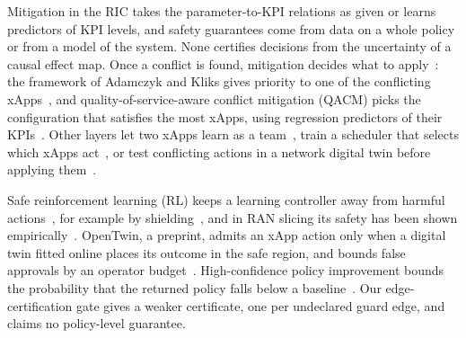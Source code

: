 Mitigation in the RIC takes the parameter-to-KPI relations as given or learns predictors of KPI levels, and safety
guarantees come from data on a whole policy or from a model of the system. None certifies decisions from the
uncertainty of a causal effect map. Once a conflict is found, mitigation decides what to
apply~\cite{ORANConflictMit,polese2023oran}: the framework of Adamczyk and Kliks gives priority to one of the
conflicting xApps~\cite{adamczyk2023conflict}, and quality-of-service-aware conflict mitigation (QACM) picks the
configuration that satisfies the most xApps, using regression predictors of their KPIs~\cite{QACM2024}. Other layers
let two xApps learn as a team~\cite{iturria2022matl}, train a scheduler that selects which xApps
act~\cite{cinemre2026scheduler}, or test conflicting actions in a network digital twin before applying
them~\cite{giannopoulos2025comix}.

Safe reinforcement learning (RL) keeps a learning controller away from harmful actions~\cite{gu2024safereview}, for
example by shielding~\cite{alshiekh2018shield}, and in RAN slicing its safety has been
shown empirically~\cite{nagib2024safe}. OpenTwin, a preprint, admits an xApp action only when a digital twin fitted
online places its outcome in the safe region, and bounds false approvals by an operator
budget~\cite{zhang2026opentwin}. High-confidence policy improvement bounds the probability that the returned policy
falls below a baseline~\cite{thomas2015hcpi}. Our edge-certification gate gives a weaker certificate, one per
undeclared guard edge, and claims no policy-level guarantee.

